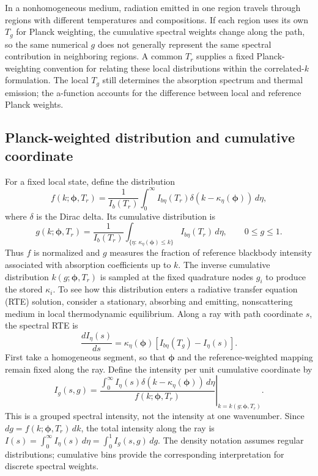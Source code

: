 \documentclass[11pt,letterpaper]{article}
\begin{document}
In a nonhomogeneous medium, radiation emitted in one region travels through
regions with different temperatures and compositions. If each region uses
its own $T_g$ for Planck weighting, the cumulative spectral weights change
along the path, so the same numerical $g$ does not generally represent the
same spectral contribution in neighboring regions. A common $T_r$ supplies
a fixed Planck-weighting convention for relating these local distributions
within the correlated-$k$ formulation. The local $T_g$ still determines the
absorption spectrum and thermal emission; the a-function accounts for the
difference between local and reference Planck weights. 

\subsection{Planck-weighted distribution and cumulative coordinate}
For a fixed local state, define the distribution
\begin{equation}
f(k;\boldsymbol{\phi},T_r)=\frac{1}{I_b(T_r)}
\int_0^\infty I_{b\eta}(T_r)
\delta\!\left(k-\kappa_\eta(\boldsymbol{\phi})\right)\,d\eta,
\label{eq:fsck-f}
\end{equation}
where $\delta$ is the Dirac delta. Its cumulative distribution is
\begin{equation}
g(k;\boldsymbol{\phi},T_r)=\frac{1}{I_b(T_r)}
\int_{\{\eta:\,\kappa_\eta(\boldsymbol{\phi})\leq k\}}
I_{b\eta}(T_r)\,d\eta,\qquad 0\leq g\leq1.
\label{eq:fsck-g}
\end{equation}
Thus $f$ is normalized and $g$ measures the fraction of reference blackbody
intensity associated with absorption coefficients up to $k$. The inverse
cumulative distribution $k(g;\boldsymbol{\phi},T_r)$ is sampled at the fixed
quadrature nodes $g_i$ to produce the stored $\kappa_i$.
To see how this distribution enters a radiative transfer equation (RTE)
solution, consider a stationary, absorbing and emitting, nonscattering medium
in local thermodynamic equilibrium. Along a ray with path coordinate $s$,
the spectral RTE is
\begin{equation}
\frac{d I_\eta(s)}{ds}
=\kappa_\eta(\boldsymbol{\phi})
\left[I_{b\eta}(T_g)-I_\eta(s)\right].
\label{eq:spectral-rte}
\end{equation}
First take a homogeneous segment, so that $\boldsymbol{\phi}$ and the
reference-weighted mapping remain fixed along the ray. Define the intensity
per unit cumulative coordinate by
\begin{equation}
I_g(s,g)=\left.
\frac{\displaystyle\int_0^\infty I_\eta(s)
\delta\!\left(k-\kappa_\eta(\boldsymbol{\phi})\right)\,d\eta}
{f(k;\boldsymbol{\phi},T_r)}\right|_{k=k(g;\boldsymbol{\phi},T_r)}.
\label{eq:ig-definition}
\end{equation}
This is a grouped spectral intensity, not the intensity at one wavenumber.
Since $dg=f(k;\boldsymbol{\phi},T_r)\,dk$, the total intensity along the ray is
$I(s)=\int_0^\infty I_\eta(s)\,d\eta=\int_0^1 I_g(s,g)\,dg$.
The density notation assumes regular distributions; cumulative bins provide
the corresponding interpretation for discrete spectral weights.
\end{document}
